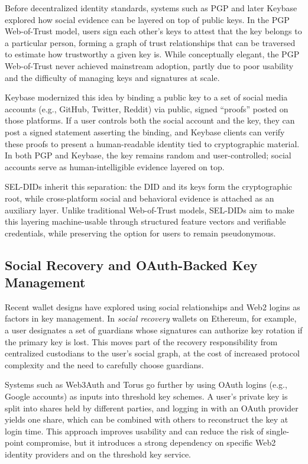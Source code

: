 \documentclass[11pt]{article}
\begin{document}
Before decentralized identity standards, systems such as PGP and later Keybase explored how social evidence can be layered on top of public keys. In the PGP Web-of-Trust model, users sign each other's keys to attest that the key belongs to a particular person, forming a graph of trust relationships that can be traversed to estimate how trustworthy a given key is. While conceptually elegant, the PGP Web-of-Trust never achieved mainstream adoption, partly due to poor usability and the difficulty of managing keys and signatures at scale.

Keybase modernized this idea by binding a public key to a set of social media accounts (e.g., GitHub, Twitter, Reddit) via public, signed ``proofs'' posted on those platforms. If a user controls both the social account and the key, they can post a signed statement asserting the binding, and Keybase clients can verify these proofs to present a human-readable identity tied to cryptographic material. In both PGP and Keybase, the key remains random and user-controlled; social accounts serve as human-intelligible evidence layered on top.

SEL-DIDs inherit this separation: the DID and its keys form the cryptographic root, while cross-platform social and behavioral evidence is attached as an auxiliary layer. Unlike traditional Web-of-Trust models, SEL-DIDs aim to make this layering machine-usable through structured feature vectors and verifiable credentials, while preserving the option for users to remain pseudonymous.
\subsection{Social Recovery and OAuth-Backed Key Management}

Recent wallet designs have explored using social relationships and Web2 logins as factors in key management. In \emph{social recovery} wallets on Ethereum, for example, a user designates a set of guardians whose signatures can authorize key rotation if the primary key is lost. This moves part of the recovery responsibility from centralized custodians to the user's social graph, at the cost of increased protocol complexity and the need to carefully choose guardians.

Systems such as Web3Auth and Torus go further by using OAuth logins (e.g., Google accounts) as inputs into threshold key schemes. A user's private key is split into shares held by different parties, and logging in with an OAuth provider yields one share, which can be combined with others to reconstruct the key at login time. This approach improves usability and can reduce the risk of single-point compromise, but it introduces a strong dependency on specific Web2 identity providers and on the threshold key service.
\end{document}
